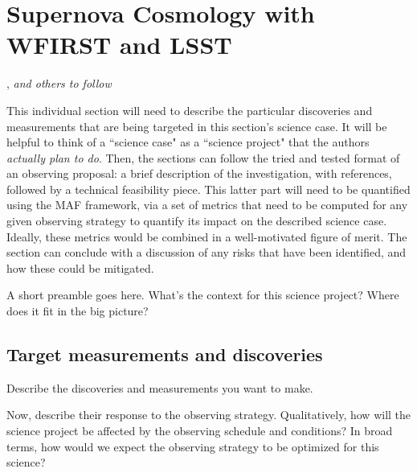 %
%
%
%
%
%
%

\section{Supernova Cosmology with WFIRST and LSST}
\def\secname{\chpname:supernovae}\label{sec:\secname}

,
{\it and others to follow}

This individual section will need to describe the particular
discoveries and measurements that are being targeted in this section's
science case. It will be helpful to think of a ``science case" as a
``science project" that the authors {\it actually plan to do}. Then,
the sections can follow the tried and tested format of an observing
proposal: a brief description of the investigation, with references,
followed by a technical feasibility piece. This latter part will need
to be quantified using the MAF framework, via a set of metrics that
need to be computed for any given observing strategy to quantify its
impact on the described science case. Ideally, these metrics would be
combined in a well-motivated figure of merit. The section can conclude
with a discussion of any risks that have been identified, and how
these could be mitigated.

A short preamble goes here. What's the context for this science
project? Where does it fit in the big picture?



\subsection{Target measurements and discoveries}
\label{sec:\secname:targets}

Describe the discoveries and measurements you want to make.

Now, describe their response to the observing strategy. Qualitatively,
how will the science project be affected by the observing schedule and
conditions? In broad terms, how would we expect the observing strategy
to be optimized for this science?


